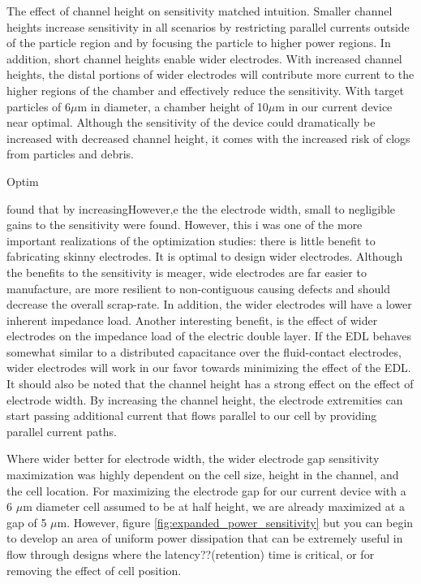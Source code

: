 \par The effect of channel height on sensitivity matched intuition. Smaller channel heights increase sensitivity in all scenarios by restricting parallel currents outside of the particle region and by focusing the particle to higher power regions. In addition, short channel heights enable wider electrodes. With increased channel heights, the distal portions of wider electrodes will contribute more current to the higher regions of the chamber and effectively reduce the sensitivity. With target particles of 6$\mu$m in diameter, a chamber height of 10$\mu$m in our current device near optimal. Although the sensitivity of the device could dramatically be increased with decreased channel height, it comes with the increased risk of clogs from particles and debris.

\par Optim

\par found that by increasingHowever,e the  the electrode width, small to negligible gains to the sensitivity were found. However, this i was one of the more important realizations of the optimization studies: there is little benefit to fabricating skinny electrodes. It is optimal to design wider electrodes. Although the benefits to the sensitivity is meager, wide electrodes are far easier to manufacture, are more resilient to non-contiguous causing defects and should decrease the overall scrap-rate. In addition, the wider electrodes will have a lower inherent impedance load. Another interesting benefit, is the effect of wider electrodes on the impedance load of the electric double layer. If the EDL behaves somewhat similar to a distributed capacitance over the fluid-contact electrodes, wider electrodes will work in our favor towards minimizing the effect of the EDL. It should also be noted that the channel height has a strong effect on the effect of electrode width. By increasing the channel height, the electrode extremities can start passing additional current that flows parallel to our cell by providing parallel current paths.

\par Where wider better for electrode width, the wider electrode gap sensitivity maximization was highly dependent on the cell size, height in the channel, and the cell location. For maximizing the electrode gap for our current device with a 6 $\mu$m diameter cell assumed to be at half height, we are already maximized at a gap of 5 $\mu$m. However, figure \ref{fig:expanded_power_sensitivity} but you can begin to develop an area of uniform power dissipation that can be extremely useful in flow through designs where the latency??(retention) time is critical, or for removing the effect of cell position. 

